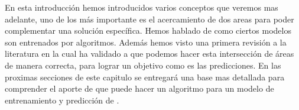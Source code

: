 
En esta introducción hemos introducidos varios conceptos que veremos mas adelante, uno de los más importante es el acercamiento de dos areas para poder complementar una solución específica. Hemos hablado de como ciertos modelos son entrenados por algoritmos. Además hemos visto una primera revisión a la literatura en la cual ha validado a que podemos hacer esta intersección de áreas de manera correcta, para lograr un objetivo como es las predicciones. En las proximas secciones de este capitulo se entregará una base mas detallada para comprender el aporte de que puede hacer un algoritmo \losslessdatacompression para un modelo de entrenamiento y predicción de \machinelearning.








